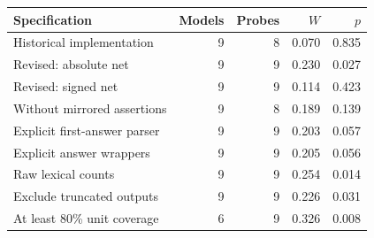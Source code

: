 \begin{tabular}{lrrrr}
\toprule
Specification & Models & Probes & $W$ & $p$ \\
\midrule
Historical implementation & 9 & 8 & 0.070 & 0.835 \\
Revised: absolute net & 9 & 9 & 0.230 & 0.027 \\
Revised: signed net & 9 & 9 & 0.114 & 0.423 \\
Without mirrored assertions & 9 & 8 & 0.189 & 0.139 \\
Explicit first-answer parser & 9 & 9 & 0.203 & 0.057 \\
Explicit answer wrappers & 9 & 9 & 0.205 & 0.056 \\
Raw lexical counts & 9 & 9 & 0.254 & 0.014 \\
Exclude truncated outputs & 9 & 9 & 0.226 & 0.031 \\
At least 80\% unit coverage & 6 & 9 & 0.326 & 0.008 \\
\bottomrule
\end{tabular}

